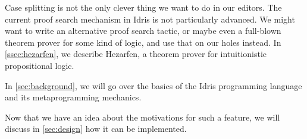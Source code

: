 Case splitting is not the only clever thing we want to do in our editors.
The current proof search mechanism in Idris is not particularly advanced.
We might want to write an alternative proof search tactic, or maybe even a
full-blown theorem prover for some kind of logic, and use that on our holes
instead. In \autoref{ssec:hezarfen}, we describe Hezarfen, a theorem prover for
intuitionistic propositional logic.


In \autoref{sec:background}, we will go over the basics of the Idris
programming language and its metaprogramming mechanics.

Now that we have an idea about the motivations for such a feature, we will
discuss in \autoref{sec:design} how it can be implemented.



